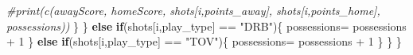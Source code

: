 \documentclass[
]{article}
\newenvironment{Shaded}{\begin{snugshade}}{\end{snugshade}}
\newcommand{\CommentTok}[1]{\textcolor[rgb]{0.56,0.35,0.01}{\textit{#1}}}
\newcommand{\ControlFlowTok}[1]{\textcolor[rgb]{0.13,0.29,0.53}{\textbf{#1}}}
\newcommand{\DecValTok}[1]{\textcolor[rgb]{0.00,0.00,0.81}{#1}}
\newcommand{\NormalTok}[1]{#1}
\newcommand{\OtherTok}[1]{\textcolor[rgb]{0.56,0.35,0.01}{#1}}
\newcommand{\SpecialCharTok}[1]{\textcolor[rgb]{0.00,0.00,0.00}{#1}}
\newcommand{\StringTok}[1]{\textcolor[rgb]{0.31,0.60,0.02}{#1}}
\begin{document}
\begin{Shaded}
\begin{Highlighting}[]
      \CommentTok{\#print(c(awayScore, homeScore, shots[i,\textquotesingle{}points\_away\textquotesingle{}], shots[i,\textquotesingle{}points\_home\textquotesingle{}], possessions))}
\NormalTok{    \}}
\NormalTok{  \}}
  \ControlFlowTok{else} \ControlFlowTok{if}\NormalTok{(shots[i,}\StringTok{\textquotesingle{}play\_type\textquotesingle{}}\NormalTok{] }\SpecialCharTok{==} \StringTok{"DRB"}\NormalTok{)\{}
\NormalTok{    possessions}\OtherTok{=}\NormalTok{ possessions }\SpecialCharTok{+} \DecValTok{1}
\NormalTok{  \}}
  \ControlFlowTok{else} \ControlFlowTok{if}\NormalTok{(shots[i,}\StringTok{\textquotesingle{}play\_type\textquotesingle{}}\NormalTok{] }\SpecialCharTok{==} \StringTok{"TOV"}\NormalTok{)\{}
\NormalTok{    possessions}\OtherTok{=}\NormalTok{ possessions }\SpecialCharTok{+} \DecValTok{1}
\NormalTok{  \}}
\NormalTok{  \}}
\NormalTok{\}}
\end{Highlighting}
\end{Shaded}
\end{document}
